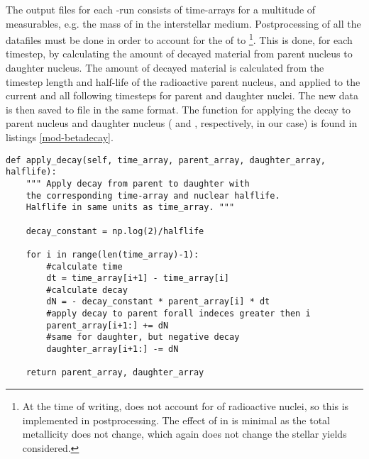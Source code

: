 \label{sec:mod-betadecay}
The output files for each \omegamodel-run consists of time-arrays for a multitude of measurables, e.g. the mass of  in the interstellar medium.
Postprocessing of all the datafiles must be done in order to account for the \betadecay of  to \footnote{At the time of writing, \omegamodel does not account for \betadecay of radioactive nuclei, so this is implemented in postprocessing. The effect of \betadecay in \omegamodel is minimal as the total metallicity does not change, which again does not change the stellar yields considered.}.
This is done, for each timestep, by calculating the amount of decayed material from parent nucleus to daughter nucleus. The amount of decayed material is calculated from the timestep length and half-life of the radioactive parent nucleus, and applied to the current and all following timesteps for parent and daughter nuclei.
The new data is then saved to file in the same format.
The function for applying the decay to parent nucleus and daughter nucleus ( and , respectively, in our case) is found in listings \ref{mod-betadecay}.

\begin{lstlisting}[style=custompython, caption={\label{lst:mod-betadecay}Snippet of code implementing \betadecay in postprocessing on data calculated by \omegamodel.}]
def apply_decay(self, time_array, parent_array, daughter_array, halflife):
    """ Apply decay from parent to daughter with 
    the corresponding time-array and nuclear halflife.
    Halflife in same units as time_array. """

    decay_constant = np.log(2)/halflife

    for i in range(len(time_array)-1):
        #calculate time
        dt = time_array[i+1] - time_array[i]
        #calculate decay
        dN = - decay_constant * parent_array[i] * dt
        #apply decay to parent forall indeces greater then i
        parent_array[i+1:] += dN
        #same for daughter, but negative decay
        daughter_array[i+1:] -= dN

    return parent_array, daughter_array
\end{lstlisting}
